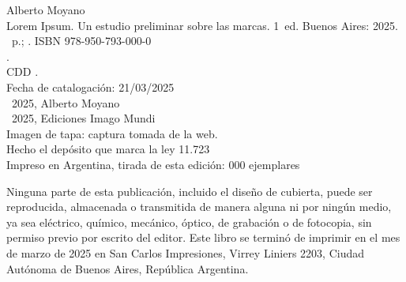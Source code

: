 \noindent Alberto Moyano \\
\noindent Lorem Ipsum. Un estudio preliminar sobre las marcas. 1~ed. Buenos Aires: 2025.\\
\noindent \ztotpages\ p.; \valorEspecifico. ISBN 978-950-793-000-0 \\
. \\
\noindent CDD .\\
\noindent Fecha de catalogación: 21/03/2025 \\
\noindent \textcopyright~2025, Alberto Moyano \\
\noindent \textcopyright~2025, Ediciones Imago Mundi\\
\noindent Imagen de tapa: captura tomada de la web.\\
\noindent Hecho el depósito que marca la ley 11.723\\
\noindent Impreso en Argentina, tirada de esta edición: 000 ejemplares\\

\vfill

\noindent {}\bigskip

\noindent Ninguna parte de esta publicación, incluido el diseño de cubierta, puede ser reproducida, almacenada o transmitida de manera alguna ni por ningún medio, ya sea eléctrico, químico, mecánico, óptico, de grabación o de fotocopia, sin permiso previo por escrito del editor. Este libro se terminó de imprimir en el mes de marzo de 2025 en San Carlos Impresiones, Virrey Liniers 2203, Ciudad Autónoma de Buenos Aires, República Argentina.
